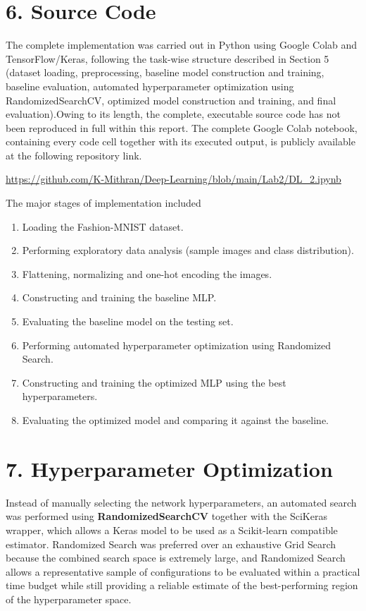 \documentclass[11pt,a4paper]{article}
\begin{document}
\section*{6. Source Code}

The complete implementation was carried out in Python using Google Colab and TensorFlow/Keras, following the task-wise structure described in Section 5 (dataset loading, preprocessing, baseline model construction and training, baseline evaluation, automated hyperparameter optimization using RandomizedSearchCV, optimized model construction and training, and final evaluation).Owing to its length, the complete, executable source code has not been reproduced in full within this report. The complete Google Colab notebook, containing every code cell together with its executed output, is publicly available at the following repository link.

\begin{center}
\url{https://github.com/K-Mithran/Deep-Learning/blob/main/Lab2/DL_2.ipynb}
\end{center}

The major stages of implementation included

\begin{enumerate}
\item Loading the Fashion-MNIST dataset.
\item Performing exploratory data analysis (sample images and class distribution).
\item Flattening, normalizing and one-hot encoding the images.
\item Constructing and training the baseline MLP.
\item Evaluating the baseline model on the testing set.
\item Performing automated hyperparameter optimization using Randomized Search.
\item Constructing and training the optimized MLP using the best hyperparameters.
\item Evaluating the optimized model and comparing it against the baseline.
\end{enumerate}
\section*{7. Hyperparameter Optimization}

Instead of manually selecting the network hyperparameters, an automated search was performed using \textbf{RandomizedSearchCV} together with the SciKeras wrapper, which allows a Keras model to be used as a Scikit-learn compatible estimator. Randomized Search was preferred over an exhaustive Grid Search because the combined search space is extremely large, and Randomized Search allows a representative sample of configurations to be evaluated within a practical time budget while still providing a reliable estimate of the best-performing region of the hyperparameter space.
\end{document}
